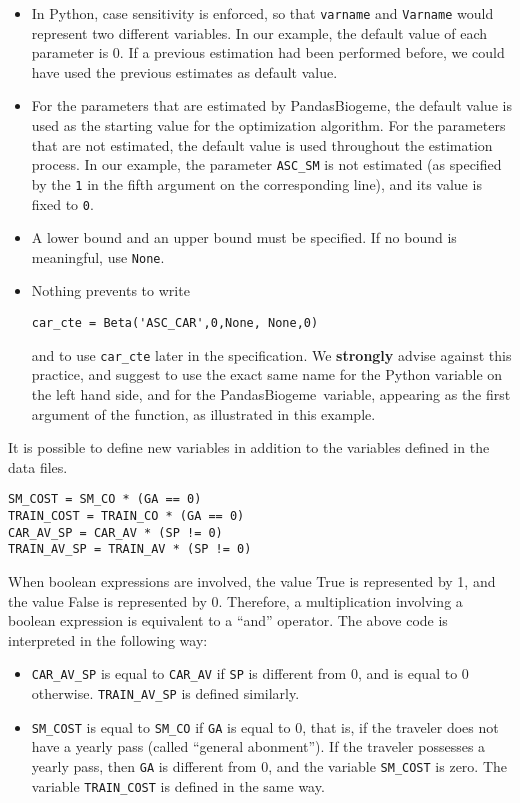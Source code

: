 \documentclass[12pt,a4paper]{article}
\newcommand{\PDBIOGEME}{PandasBiogeme}
\begin{document}
\begin{itemize}
\item  In Python, case sensitivity is enforced, so that
\verb+varname+ and \verb+Varname+ would represent two different
variables.  In our example, the default value of each parameter is
0. If a previous estimation had been performed before, we could have
used the previous estimates as default value.
\item For the
parameters that are estimated by \PDBIOGEME, the default value is used
as the starting value for the optimization algorithm. For the
parameters that are not estimated, the default value is used
throughout the estimation process. In our example, the parameter
\lstinline$ASC_SM$ is not estimated (as specified by the \lstinline$1$
in the fifth argument on the corresponding line), and its value is
fixed to \lstinline$0$.
\item 
A lower bound and an upper bound must be
specified. If no bound is meaningful,  use \lstinline$None$.
\item Nothing
prevents to write
\begin{lstlisting}[style=nonumbers]
car_cte = Beta('ASC_CAR',0,None, None,0)
\end{lstlisting}
and to use \lstinline+car_cte+ later in the specification.   We
\textbf{strongly} advise against this practice, and suggest to use the
exact same name for the Python variable on the left hand side, and for
the \PDBIOGEME\ variable, appearing as the first argument of the
function, as illustrated in this example. 
\end{itemize}

It is possible to define new variables in addition to the variables
defined in the data files. 
\begin{lstlisting}[style=nonumbers]
SM_COST = SM_CO * (GA == 0)
TRAIN_COST = TRAIN_CO * (GA == 0)
CAR_AV_SP = CAR_AV * (SP != 0)
TRAIN_AV_SP = TRAIN_AV * (SP != 0)
\end{lstlisting}

When boolean expressions are involved, the value True is
  represented by 1, and the value False is represented by
  0. Therefore, a multiplication involving a boolean expression is
  equivalent to a ``and'' operator. The above code is interpreted in
  the following way:
\begin{itemize}
\item \lstinline$CAR_AV_SP$ is equal to \lstinline$CAR_AV$ if
  \lstinline$SP$ is different from 0, and is equal to 0
  otherwise. \lstinline$TRAIN_AV_SP$ is defined similarly.
\item \lstinline$SM_COST$ is equal to \lstinline$SM_CO$ if
  \lstinline$GA$ is equal to 0, that is, if the traveler does not have
  a yearly pass (called ``general abonment''). If the traveler
  possesses a yearly pass, then \lstinline$GA$ is different from 0,
  and the variable \lstinline$SM_COST$ is zero. The variable
  \lstinline$TRAIN_COST$ is defined in the same way.
\end{itemize}
\end{document}
